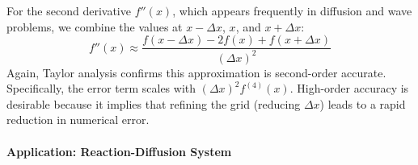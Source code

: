 For the second derivative $f''(x)$, which appears frequently in diffusion and wave problems, we combine the values at $x-\Delta x$, $x$, and $x+\Delta x$:
\begin{equation}
    f''(x) \approx \frac{f(x - \Delta x) - 2f(x) + f(x + \Delta x)}{(\Delta x)^2}
\end{equation}
Again, Taylor analysis confirms this approximation is second-order accurate. Specifically, the error term scales with $(\Delta x)^2 f^{(4)}(x)$. High-order accuracy is desirable because it implies that refining the grid (reducing $\Delta x$) leads to a rapid reduction in numerical error.

\paragraph*{Application: Reaction-Diffusion System}

